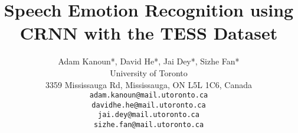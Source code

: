 \documentclass{article}
\title{Speech Emotion Recognition using CRNN with the TESS Dataset}
\author{%
  Adam Kanoun*, David He*, Jai Dey*, Sizhe Fan*
  \\ University of Toronto\\3359 Mississauga Rd, Mississauga, ON L5L 1C6, Canada \\
  \texttt{adam.kanoun@mail.utoronto.ca} \\
  \texttt{davidhe.he@mail.utoronto.ca} \\
  \texttt{jai.dey@mail.utoronto.ca} \\
  \texttt{sizhe.fan@mail.utoronto.ca} \\
}
\begin{document}
\maketitle



















\break



\end{document}
